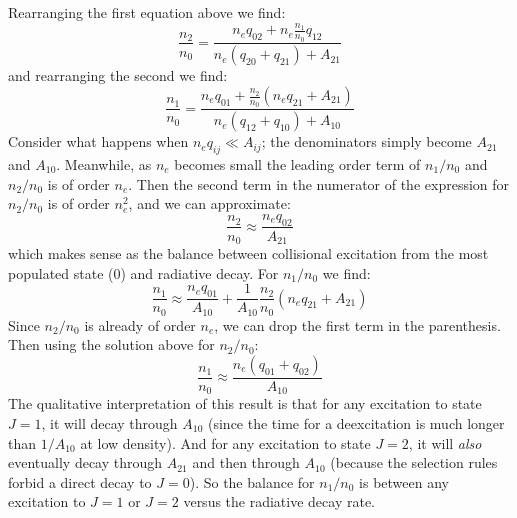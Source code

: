 \documentclass[11pt, preprint]{article}
\begin{document}
\begin{enumerate}
\begin{enumerate}
    \begin{answer}
      Rearranging the first equation above we find:
      \begin{equation}
        \frac{n_2}{n_0} =  \frac{n_eq_{02} + n_e \frac{n_1}{n_0}
          q_{12}}{n_e\left(q_{20} + q_{21}\right) + A_{21}}
      \end{equation}
      and rearranging the second we find:
      \begin{equation}
        \frac{n_1}{n_0} =  \frac{n_e q_{01} + \frac{n_2}{n_0}
          \left(n_e q_{21}  +A_{21}\right)}
             {n_e\left(q_{12} + q_{10}\right) + A_{10}}
      \end{equation}
      Consider what happens when $n_e q_{ij} \ll A_{ij}$; the
      denominators simply become $A_{21}$ and $A_{10}$. Meanwhile, as
      $n_e$ becomes small the leading order term of $n_1/n_0$ and
      $n_2/n_0$ is of order $n_e$. Then the second term in the
      numerator of the expression for $n_2/n_0$ is of order $n_e^2$,
      and we can approximate:
      \begin{equation}
        \frac{n_2}{n_0} \approx \frac{n_e q_{02}}{A_{21}}
      \end{equation}
      which makes sense as the balance between collisional excitation
      from the most populated state (0) and radiative decay. For
      $n_1/n_0$ we find:
      \begin{equation}
        \frac{n_1}{n_0} \approx \frac{n_e q_{01}}{A_{10}} +
        \frac{1}{A_{10}} \frac{n_2}{n_0} \left(n_e q_{21} + A_{21}\right)
      \end{equation}
      Since $n_2/n_0$ is already of order $n_e$, we can drop the first
      term in the parenthesis. Then using the solution above for
      $n_2/n_0$:
      \begin{equation}
        \frac{n_1}{n_0} \approx \frac{n_e\left(q_{01} +
          q_{02}\right)}{A_{10}}
      \end{equation}
      The qualitative interpretation of this result is that for any
      excitation to state $J=1$, it will decay through $A_{10}$ (since
      the time for a deexcitation is much longer than $1/A_{10}$ at
      low density). And for any excitation to state $J=2$, it will
      {\it also} eventually decay through $A_{21}$ and then through
      $A_{10}$ (because the selection rules forbid a direct decay to
      $J=0$). So the balance for $n_1/n_0$ is between any excitation
      to $J=1$ or $J=2$ versus the radiative decay rate.


\end{answer}
\end{enumerate}
\end{enumerate}
\end{document}
